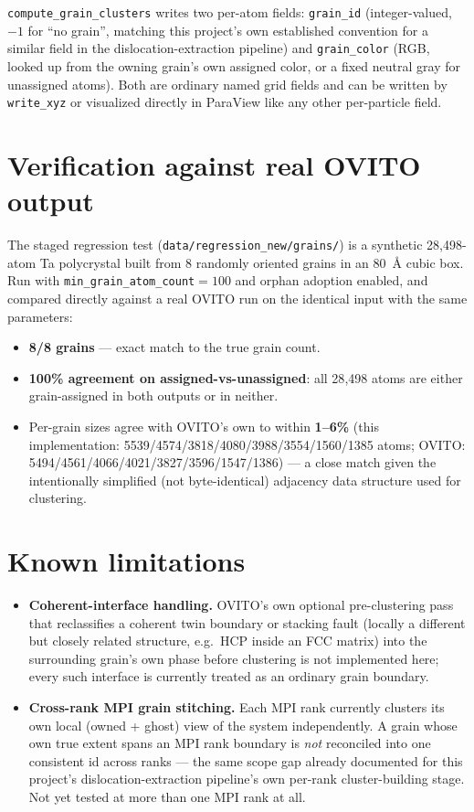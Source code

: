 \documentclass[11pt,a4paper]{article}
\newcommand{\op}[1]{\texttt{#1}}
\newcommand{\field}[1]{\texttt{#1}}
\begin{document}
\op{compute\_grain\_clusters} writes two per-atom fields: \field{grain\_id} (integer-valued,
$-1$ for ``no grain'', matching this project's own established convention for a similar field in
the dislocation-extraction pipeline) and \field{grain\_color} (RGB, looked up from the owning
grain's own assigned color, or a fixed neutral gray for unassigned atoms). Both are ordinary named
grid fields and can be written by \op{write\_xyz} or visualized directly in ParaView like any other
per-particle field.

\section{Verification against real OVITO output}

The staged regression test (\texttt{data/regression\_new/grains/}) is a synthetic 28{,}498-atom Ta
polycrystal built from 8 randomly oriented grains in an 80~\AA{} cubic box. Run with
\field{min\_grain\_atom\_count}$=100$ and orphan adoption enabled, and compared directly against a
real OVITO run on the identical input with the same parameters:

\begin{itemize}[nosep]
  \item \textbf{8/8 grains} — exact match to the true grain count.
  \item \textbf{100\% agreement on assigned-vs-unassigned}: all 28{,}498 atoms are either
    grain-assigned in both outputs or in neither.
  \item Per-grain sizes agree with OVITO's own to within \textbf{1--6\%}
    (this implementation: 5539/4574/3818/4080/3988/3554/1560/1385 atoms;
    OVITO: 5494/4561/4066/4021/3827/3596/1547/1386) — a close match given the intentionally
    simplified (not byte-identical) adjacency data structure used for clustering.
\end{itemize}

\section{Known limitations}

\begin{itemize}[nosep]
  \item \textbf{Coherent-interface handling.} OVITO's own optional pre-clustering pass that
    reclassifies a coherent twin boundary or stacking fault (locally a different but closely
    related structure, e.g.\ HCP inside an FCC matrix) into the surrounding grain's own phase
    before clustering is not implemented here; every such interface is currently treated as an
    ordinary grain boundary.
  \item \textbf{Cross-rank MPI grain stitching.} Each MPI rank currently clusters its own local
    (owned + ghost) view of the system independently. A grain whose own true extent spans an MPI
    rank boundary is \emph{not} reconciled into one consistent id across ranks — the same scope
    gap already documented for this project's dislocation-extraction pipeline's own per-rank
    cluster-building stage. Not yet tested at more than one MPI rank at all.
\end{itemize}
\end{document}
